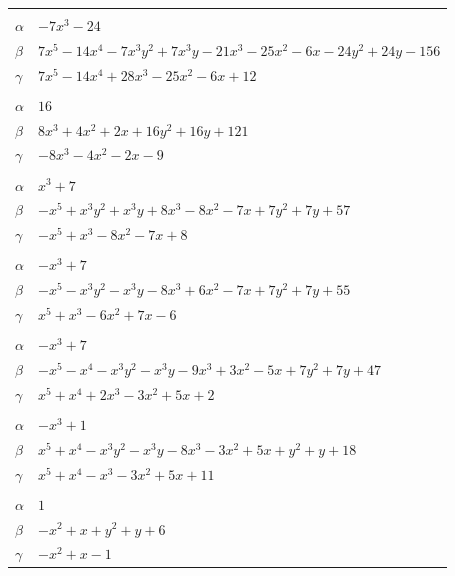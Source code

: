 \documentclass[11pt]{article}
\begin{document}
\begin{longtable}{@{}ll@{}}
\addlinespace[3pt]
\multicolumn{2}{@{}l}{$\{i,j\}=\{2,39\}$, $k_{ij}=2^{6}\cdot 3$}\\
$\alpha$ & $-7x^{3}-24$\\
$\beta$ & $7x^{5}-14x^{4}-7x^{3}y^{2}+7x^{3}y-21x^{3}-25x^{2}-6x-24y^{2}+24y-156$\\
$\gamma$ & $7x^{5}-14x^{4}+28x^{3}-25x^{2}-6x+12$\\
\addlinespace[3pt]
\multicolumn{2}{@{}l}{$\{i,j\}=\{3,10\}$, $k_{ij}=3\cdot 5\cdot 7$}\\
$\alpha$ & $16$\\
$\beta$ & $8x^{3}+4x^{2}+2x+16y^{2}+16y+121$\\
$\gamma$ & $-8x^{3}-4x^{2}-2x-9$\\
\addlinespace[3pt]
\multicolumn{2}{@{}l}{$\{i,j\}=\{3,19\}$, $k_{ij}=2\cdot 5^{2}$}\\
$\alpha$ & $x^{3}+7$\\
$\beta$ & $-x^{5}+x^{3}y^{2}+x^{3}y+8x^{3}-8x^{2}-7x+7y^{2}+7y+57$\\
$\gamma$ & $-x^{5}+x^{3}-8x^{2}-7x+8$\\
\addlinespace[3pt]
\multicolumn{2}{@{}l}{$\{i,j\}=\{3,20\}$, $k_{ij}=2^{4}\cdot 3$}\\
$\alpha$ & $-x^{3}+7$\\
$\beta$ & $-x^{5}-x^{3}y^{2}-x^{3}y-8x^{3}+6x^{2}-7x+7y^{2}+7y+55$\\
$\gamma$ & $x^{5}+x^{3}-6x^{2}+7x-6$\\
\addlinespace[3pt]
\multicolumn{2}{@{}l}{$\{i,j\}=\{3,22\}$, $k_{ij}=2^{3}\cdot 5$}\\
$\alpha$ & $-x^{3}+7$\\
$\beta$ & $-x^{5}-x^{4}-x^{3}y^{2}-x^{3}y-9x^{3}+3x^{2}-5x+7y^{2}+7y+47$\\
$\gamma$ & $x^{5}+x^{4}+2x^{3}-3x^{2}+5x+2$\\
\addlinespace[3pt]
\multicolumn{2}{@{}l}{$\{i,j\}=\{3,27\}$, $k_{ij}=2^{2}\cdot 7$}\\
$\alpha$ & $-x^{3}+1$\\
$\beta$ & $x^{5}+x^{4}-x^{3}y^{2}-x^{3}y-8x^{3}-3x^{2}+5x+y^{2}+y+18$\\
$\gamma$ & $x^{5}+x^{4}-x^{3}-3x^{2}+5x+11$\\
\addlinespace[3pt]
\multicolumn{2}{@{}l}{$\{i,j\}=\{3,29\}$, $k_{ij}=2\cdot 3$}\\
$\alpha$ & $1$\\
$\beta$ & $-x^{2}+x+y^{2}+y+6$\\
$\gamma$ & $-x^{2}+x-1$\\

\end{longtable}
\end{document}
